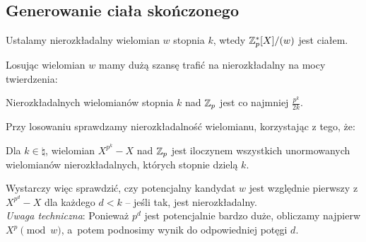 \subsection{Generowanie ciała skończonego}
Ustalamy nierozkładalny wielomian \( w \) stopnia \( k \), wtedy \( \mathbb{Z}_p^*[X]/(w) \) jest ciałem.

Losując wielomian \( w \) mamy dużą szansę trafić na nierozkładalny na mocy twierdzenia:
\begin{theorem}
    Nierozkładalnych wielomianów stopnia \( k \) nad \( \mathbb{Z}_p \) jest co najmniej \( \frac{p^k}{2k} \).
\end{theorem}
Przy losowaniu sprawdzamy nierozkładalność wielomianu, korzystając z tego, że:
\begin{theorem}
    Dla \( k \in \natural \), wielomian \( X^{p^k} - X \) nad \( \mathbb{Z}_p \) jest iloczynem wszystkich unormowanych wielomianów nierozkładalnych, których stopnie dzielą \( k \).
\end{theorem}
Wystarczy więc sprawdzić, czy potencjalny kandydat \( w \) jest względnie pierwszy z \( X^{p^d} - X \) dla każdego \( d < k \) -- jeśli tak, jest nierozkładalny. \\
\textit{Uwaga techniczna}: Ponieważ \( p^d \) jest potencjalnie bardzo duże, obliczamy najpierw \( X^p \pmod{w} \), a~potem podnosimy wynik do odpowiedniej potęgi \( d \).
